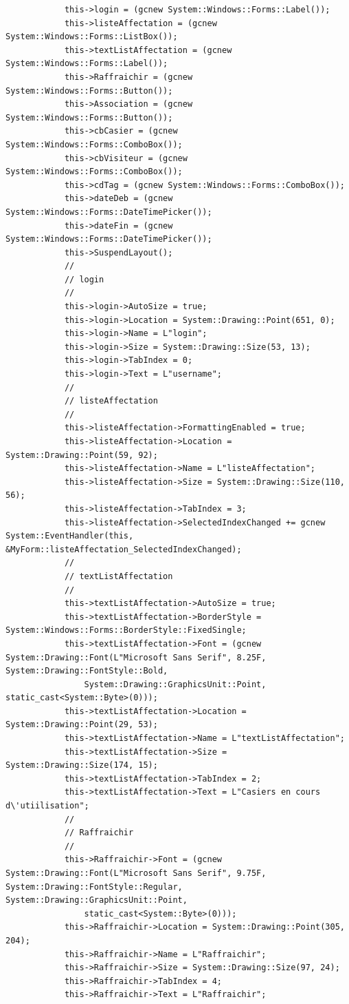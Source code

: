 \documentclass[main.tex]{subfiles}
\begin{document}
\begin{lstlisting}
			this->login = (gcnew System::Windows::Forms::Label());
			this->listeAffectation = (gcnew System::Windows::Forms::ListBox());
			this->textListAffectation = (gcnew System::Windows::Forms::Label());
			this->Raffraichir = (gcnew System::Windows::Forms::Button());
			this->Association = (gcnew System::Windows::Forms::Button());
			this->cbCasier = (gcnew System::Windows::Forms::ComboBox());
			this->cbVisiteur = (gcnew System::Windows::Forms::ComboBox());
			this->cdTag = (gcnew System::Windows::Forms::ComboBox());
			this->dateDeb = (gcnew System::Windows::Forms::DateTimePicker());
			this->dateFin = (gcnew System::Windows::Forms::DateTimePicker());
			this->SuspendLayout();
			// 
			// login
			// 
			this->login->AutoSize = true;
			this->login->Location = System::Drawing::Point(651, 0);
			this->login->Name = L"login";
			this->login->Size = System::Drawing::Size(53, 13);
			this->login->TabIndex = 0;
			this->login->Text = L"username";
			// 
			// listeAffectation
			// 
			this->listeAffectation->FormattingEnabled = true;
			this->listeAffectation->Location = System::Drawing::Point(59, 92);
			this->listeAffectation->Name = L"listeAffectation";
			this->listeAffectation->Size = System::Drawing::Size(110, 56);
			this->listeAffectation->TabIndex = 3;
			this->listeAffectation->SelectedIndexChanged += gcnew System::EventHandler(this, &MyForm::listeAffectation_SelectedIndexChanged);
			// 
			// textListAffectation
			// 
			this->textListAffectation->AutoSize = true;
			this->textListAffectation->BorderStyle = System::Windows::Forms::BorderStyle::FixedSingle;
			this->textListAffectation->Font = (gcnew System::Drawing::Font(L"Microsoft Sans Serif", 8.25F, System::Drawing::FontStyle::Bold,
				System::Drawing::GraphicsUnit::Point, static_cast<System::Byte>(0)));
			this->textListAffectation->Location = System::Drawing::Point(29, 53);
			this->textListAffectation->Name = L"textListAffectation";
			this->textListAffectation->Size = System::Drawing::Size(174, 15);
			this->textListAffectation->TabIndex = 2;
			this->textListAffectation->Text = L"Casiers en cours d\'utiilisation";
			// 
			// Raffraichir
			// 
			this->Raffraichir->Font = (gcnew System::Drawing::Font(L"Microsoft Sans Serif", 9.75F, System::Drawing::FontStyle::Regular, System::Drawing::GraphicsUnit::Point,
				static_cast<System::Byte>(0)));
			this->Raffraichir->Location = System::Drawing::Point(305, 204);
			this->Raffraichir->Name = L"Raffraichir";
			this->Raffraichir->Size = System::Drawing::Size(97, 24);
			this->Raffraichir->TabIndex = 4;
			this->Raffraichir->Text = L"Raffraichir";

\end{lstlisting}
\end{document}
